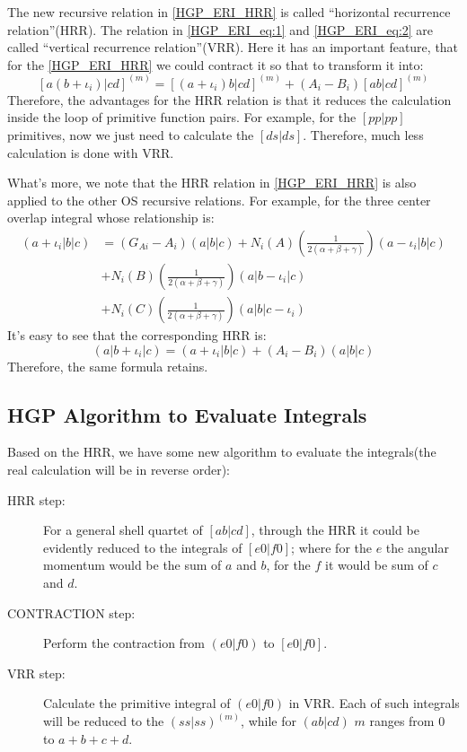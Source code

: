 The new recursive relation in \ref{HGP_ERI_HRR} is called ``horizontal
recurrence relation''(HRR). The relation in \ref{HGP_ERI_eq:1} and 
\ref{HGP_ERI_eq:2} are called ``vertical recurrence relation''(VRR). 
Here it has an important feature, that for the \ref{HGP_ERI_HRR} 
we could contract it so that to transform it into:
\begin{equation}
 \label{HGP_ERI_eq:3} 
 [a(b+\iota_{i})|cd]^{(m)} = [(a+\iota_{i})b|cd]^{(m)} + 
(A_{i} - B_{i})[ab|cd]^{(m)}
\end{equation}
Therefore, the advantages for the HRR relation is that it reduces the
calculation inside the loop of primitive function pairs. For example, for the
$[pp|pp]$ primitives, now we just need to calculate the $[ds|ds]$. Therefore,
much less calculation is done with VRR.

What's more, we note that the HRR relation in \ref{HGP_ERI_HRR} is also applied 
to the other OS recursive relations. For example, for the three center overlap
integral whose relationship is:
\begin{equation}
 \begin{split}
 (a+\iota_{i}|b|c) 
&= (G_{Ai} - A_{i})(a|b|c) + 
N_{i}(A)\left(\frac{1}{2(\alpha+\beta+\gamma)}\right)(a-\iota_{i}|b|c) \\
&+ 
N_{i}(B)\left(\frac{1}{2(\alpha+\beta+\gamma)}\right)(a|b-\iota_{i}|c) \\
&+
N_{i}(C)\left(\frac{1}{2(\alpha+\beta+\gamma)}\right)(a|b|c-\iota_{i}) 
 \end{split}
\end{equation}
It's easy to see that the corresponding HRR is:
\begin{equation}
\label{HGP_ERI_eq:4}
 (a|b+\iota_{i}|c) = (a+\iota_{i}|b|c) + 
(A_{i} - B_{i})(a|b|c)
\end{equation}
Therefore, the same formula retains.


\subsection{HGP Algorithm to Evaluate Integrals}
%
%
%
Based on the HRR, we have some new algorithm to evaluate the integrals(the
real calculation will be in reverse order):
\begin{description}
 \item[HRR step:]
 For a general shell quartet of $[ab|cd]$, through the HRR it could be
 evidently reduced to the integrals of $[e0|f0]$; where for the $e$ the angular
 momentum would be the sum of $a$ and $b$, for the $f$ it would be sum of $c$
 and $d$.
 \item[CONTRACTION step:]
 Perform the contraction from $(e0|f0)$ to $[e0|f0]$.
 \item[VRR step:]
 Calculate the primitive integral of $(e0|f0)$ in VRR. Each of such integrals
 will be reduced to the $(ss|ss)^{(m)}$, while for $(ab|cd)$ $m$ ranges from
 0 to $a+b+c+d$. 
 \end{description}

